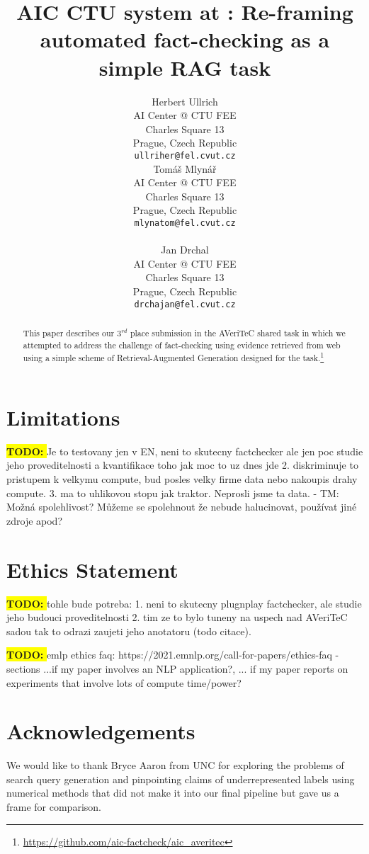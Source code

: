 \documentclass[11pt]{article}
\title{AIC CTU system at \averitec{}: Re-framing automated fact-checking as a simple RAG task}
\author{Herbert Ullrich \\
AI Center @ CTU FEE\\
Charles Square 13\\
Prague, Czech Republic\\
\texttt{ullriher@fel.cvut.cz} \\\And
Tomáš Mlynář \\
AI Center @ CTU FEE\\
Charles Square 13\\
Prague, Czech Republic\\
\texttt{mlynatom@fel.cvut.cz} \\ \\\And
Jan Drchal \\
AI Center @ CTU FEE\\
Charles Square 13\\
Prague, Czech Republic\\
\texttt{drchajan@fel.cvut.cz} \\}
\newcommand{\todo}[1]{{\color{red}\colorbox{yellow}{\textbf{TODO: }}#1}}
\newcommand{\averitec}{AVeriTeC}
\begin{document}
{\makeatletter\acl@finalcopytrue
  \maketitle
}
\begin{abstract}
This paper describes our $3^{rd}$ place submission in the \averitec{} shared task in which we attempted to address the challenge of fact-checking using evidence retrieved from web using a simple scheme of Retrieval-Augmented Generation designed for the task.\footnote{\url{https://github.com/aic-factcheck/aic_averitec}}
\end{abstract}





%


\section*{Limitations}
\todo{Je to testovany jen v EN, neni to skutecny factchecker ale jen poc studie jeho proveditelnosti a kvantifikace toho jak moc to uz dnes jde 2. diskriminuje to pristupem k velkymu compute, bud posles velky firme data nebo nakoupis drahy compute. 3. ma to uhlikovou stopu jak traktor. Neprosli jsme ta data. - TM: Možná spolehlivost? Můžeme se spolehnout že nebude halucinovat, používat jiné zdroje apod?}

\section*{Ethics Statement}
\todo{tohle bude potreba: 1. neni to skutecny plugnplay factchecker, ale studie jeho budouci proveditelnosti 2. tim ze to bylo tuneny na uspech nad \averitec{}  sadou tak to odrazi zaujeti jeho anotatoru (todo citace).}

\todo{emlp ethics faq: https://2021.emnlp.org/call-for-papers/ethics-faq - sections ...if my paper involves an NLP application?, ... if my paper reports on experiments that involve lots of compute time/power?}

\section*{Acknowledgements}
We would like to thank Bryce Aaron from UNC for exploring the problems of search query generation and pinpointing claims of underrepresented labels using numerical methods that did not make it into our final pipeline but gave us a frame for comparison. 
\end{document}

